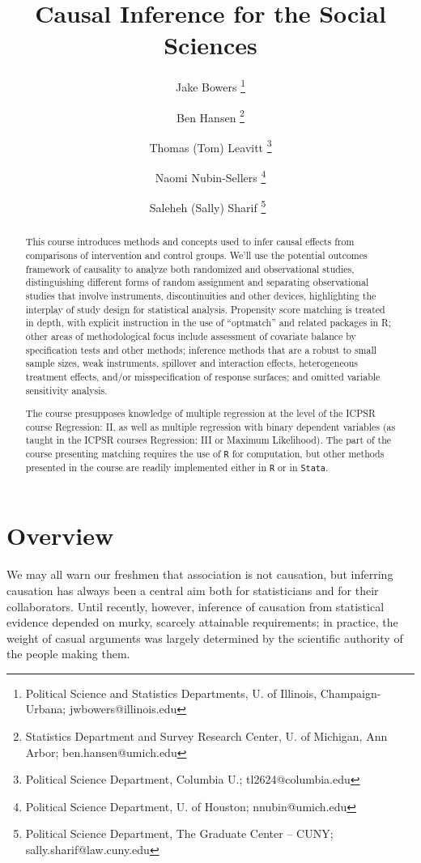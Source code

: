 \documentclass[12pt]{article}
\title{Causal Inference for the Social Sciences}
\author{ Jake Bowers \thanks{Political Science and Statistics
    Departments, U. of Illinois, Champaign-Urbana; jwbowers@illinois.edu}
\and Ben Hansen \thanks{Statistics Department and Survey Research Center, U. of Michigan, Ann Arbor; ben.hansen@umich.edu} \and Thomas (Tom)
Leavitt \thanks{Political Science Department, Columbia U.; \mbox{tl2624@columbia.edu}} \and Naomi Nubin-Sellers \thanks{Political Science Department, U. of Houston; \mbox{nnubin@umich.edu}} \and Saleheh (Sally) Sharif \thanks{Political Science Department, The Graduate Center -- CUNY; \mbox{sally.sharif@law.cuny.edu}} \,}
\begin{document}
\maketitle
\begin{abstract}
This course introduces methods and concepts used to infer causal effects from comparisons of intervention and control groups.  We'll use the potential outcomes framework of causality to analyze both randomized and observational studies, distinguishing different forms of random assignment and separating observational studies that involve instruments, discontinuities and other devices, highlighting the interplay of study design for statistical analysis.  Propensity score matching is treated in depth, with explicit instruction in the use of ``optmatch'' and related packages in R; other areas of methodological focus include assessment of covariate balance by specification tests and other methods; inference methods that are a robust to small sample sizes, weak instruments, spillover and interaction effects, heterogeneous treatment effects, and/or misspecification of response surfaces; and omitted variable sensitivity analysis.  %

The course presupposes knowledge of multiple regression at the level
of the ICPSR course Regression: II, as well as multiple regression
with binary dependent variables (as taught in the ICPSR courses
Regression: III or Maximum Likelihood).  The part of the course presenting matching requires the use of \texttt{R} for computation, but other methods presented in the course are readily implemented either in \texttt{R} or in \texttt{Stata}.
\end{abstract}




\clearpage

\nobibliography*


\section*{Overview}

We may all warn our freshmen that association is not causation, but inferring causation has always been a central aim both for statisticians and for their collaborators. Until recently, however, inference of causation from statistical evidence depended on murky, scarcely attainable requirements; in practice, the weight of casual arguments was largely determined by the scientific authority of the people making them.
\end{document}
